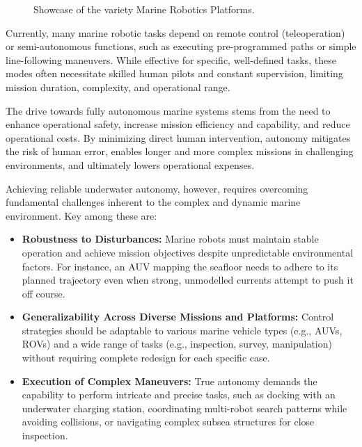 \begin{figure}[!h]
    \caption{Showcase of the variety Marine Robotics Platforms.}
    \label{fig:underwater_robotics_applications}
\end{figure}


Currently, many marine robotic tasks depend on remote control (teleoperation) or semi-autonomous functions, such as executing pre-programmed paths or simple line-following maneuvers. While effective for specific, well-defined tasks, these modes often necessitate skilled human pilots and constant supervision, limiting mission duration, complexity, and operational range.

The drive towards fully autonomous marine systems stems from the need to enhance operational safety, increase mission efficiency and capability, and reduce operational costs. By minimizing direct human intervention, autonomy mitigates the risk of human error, enables longer and more complex missions in challenging environments, and ultimately lowers operational expenses.


Achieving reliable underwater autonomy, however, requires overcoming fundamental challenges inherent to the complex and dynamic marine environment. Key among these are:

\begin{itemize}
    \item \textbf{Robustness to Disturbances:} Marine robots must maintain stable operation and achieve mission objectives despite unpredictable environmental factors. For instance, an \ac{AUV} mapping the seafloor needs to adhere to its planned trajectory even when strong, unmodelled currents attempt to push it off course.
    \item \textbf{Generalizability Across Diverse Missions and Platforms:} Control strategies should be adaptable to various marine vehicle types (e.g., \acp{AUV}, \acp{ROV}) and a wide range of tasks (e.g., inspection, survey, manipulation) without requiring complete redesign for each specific case.
    \item \textbf{Execution of Complex Maneuvers:} True autonomy demands the capability to perform intricate and precise tasks, such as docking with an underwater charging station, coordinating multi-robot search patterns while avoiding collisions, or navigating complex subsea structures for close inspection.
\end{itemize}



